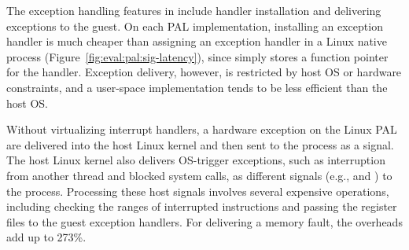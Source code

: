 







The exception handling features in \thehostabi{} include
handler installation
and delivering exceptions to the guest.
On each PAL implementation,
installing an exception handler is much cheaper than assigning an exception handler
in a Linux native process
(Figure~\ref{fig:eval:pal:sig-latency}),
since \thehostabi{} simply stores a function pointer for the handler.
Exception delivery, however,
is restricted by host OS or hardware constraints,
and a user-space
implementation tends to be less efficient
than the host OS.



Without virtualizing interrupt handlers,
a hardware exception
on the Linux PAL are delivered into the host Linux kernel
and then sent to the process as a signal.
The host Linux kernel
also delivers
OS-trigger exceptions,
such as interruption from another thread
and blocked system calls,
as different signals (e.g.,  and ) to the process.
Processing these
host signals involves several expensive operations,
including
checking the ranges of interrupted instructions
and passing the register files
to the guest exception handlers.
For delivering a memory fault,
the overheads add up to \roughly{}273\%.

\begin{figure*}[t!]
\centering
\footnotesize
{}
\caption{Latency of (a) installing an exception handler; (b)
interrupting a running thread with signals (on Linux) or  on the PALs; (c) catching a memory protection fault. Lower is better. The comparison is between (1) signals on Linux; (2) the Linux PAL, with and without a \seccomp{} filter ({\bf +SC}) and reference monitor ({\bf +RM}); (3) the \sgx{} PAL.}
\label{fig:eval:pal:sig-latency}
\end{figure*}


